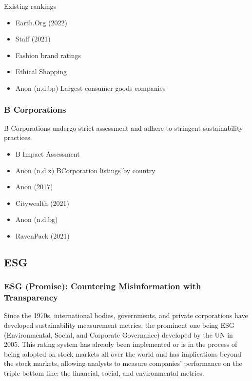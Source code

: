 \documentclass[
  letterpaper,
  DIV=11,
  numbers=noendperiod]{scrartcl}
\providecommand{\tightlist}{%
  \setlength{\itemsep}{0pt}\setlength{\parskip}{0pt}}\usepackage{longtable,booktabs,array}
\begin{document}
Existing rankings

\begin{itemize}
\tightlist
\item
  Earth.Org (2022)
\item
  Staff (2021)
\item
  Fashion brand ratings
\item
  Ethical Shopping
\item
  Anon (n.d.bp) Largest consumer goods companies
\end{itemize}

\subsubsection{B Corporations}\label{b-corporations}

B Corporations undergo strict assessment and adhere to stringent
sustainability practices.

\begin{itemize}
\item
  B Impact Assessment
\item
  Anon (n.d.x) BCorporation listings by country
\item
  Anon (2017)
\item
  Citywealth (2021)
\item
  Anon (n.d.bg)
\item
  RavenPack (2021)
\end{itemize}

\subsection{ESG}\label{esg}

\subsubsection{ESG (Promise): Countering Misinformation with
Transparency}\label{esg-promise-countering-misinformation-with-transparency}

Since the 1970s, international bodies, governments, and private
corporations have developed sustainability measurement metrics, the
prominent one being ESG (Environmental, Social, and Corporate
Governance) developed by the UN in 2005. This rating system has already
been implemented or is in the process of being adopted on stock markets
all over the world and has implications beyond the stock markets,
allowing analysts to measure companies' performance on the triple bottom
line: the financial, social, and environmental metrics.
\end{document}
